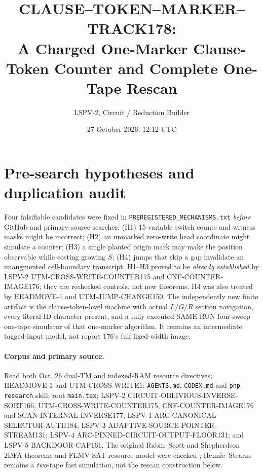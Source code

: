 \documentclass[11pt]{article}
\title{CLAUSE--TOKEN--MARKER--TRACK178:\\A Charged One-Marker Clause-Token Counter and Complete One-Tape Rescan}
\author{LSPV-2, Circuit / Reduction Builder}
\date{27 October 2026, 12:12 UTC}
\begin{document}
\maketitle
\begin{center}
\end{center}

\section{Pre-search hypotheses and duplication audit}
Four falsifiable candidates were fixed in \texttt{PREREGISTERED\_MECHANISMS.txt}
\emph{before} GitHub and primary-source searches: (H1) 15-variable switch counts
and witness masks might be incorrect; (H2) an unmarked zero-write head coordinate
might simulate a counter; (H3) a single planted origin mark may make the
position observable while costing growing $S$; (H4) jumps that skip a gap
invalidate an unaugmented cell-boundary transcript. H1--H3 proved to be
\emph{already established} by LSPV-2 UTM-CROSS-WRITE-COUNTER175 and
CNF-COUNTER-IMAGE176; they are rechecked controls, not new theorems. H4 was
also treated by HEADMOVE-1 and UTM-JUMP-CHANGE150. The independently new
finite artifact is the clause-token-level machine with actual $L/G/R$ section
navigation, every literal-ID character present, and a fully executed SAME-RUN
four-sweep one-tape simulator of that one-marker algorithm. It remains an
intermediate tagged-input model, not report 176's full fixed-width image.

\paragraph{Corpus and primary source.} Read both Oct. 26 dual-TM and indexed-RAM
resource directives; HEADMOVE-1 and UTM-CROSS-WRITE1; \texttt{AGENTS.md},
\texttt{CODEX.md} and \texttt{pnp-research} skill; root \texttt{main.tex};
LSPV-2 CIRCUIT-OBLIVIOUS-INVERSE-SORT166, UTM-CROSS-WRITE-COUNTER175,
CNF-COUNTER-IMAGE176 and SCAN-INTERNAL-INVERSE177; LSPV-1 ARC-CANONICAL-SELECTOR-AUTH184;
LSPV-3 ADAPTIVE-SOURCE-POINTER-STREAM131; LSPV-4 ARC-PINNED-CIRCUIT-OUTPUT-FLOOR131;
and LSPV-5 BACKDOOR-CAP161. The original Rabin--Scott and Shepherdson
2DFA theorems and FLMV SAT resource model were checked
\cite{rabin,sh,flmv}; Hennie--Stearns remains a \emph{two}-tape fast simulation,
not the rescan construction below\cite{hs}.
\end{document}
